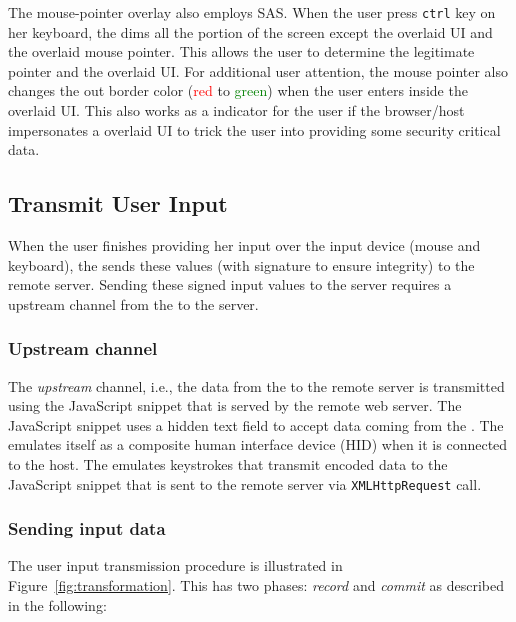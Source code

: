  The mouse-pointer overlay also employs SAS. When the user press \texttt{ctrl} key on her keyboard, the \device dims all the portion of the screen except the overlaid UI and the overlaid mouse pointer. This allows the user to determine the legitimate pointer and the overlaid UI. For additional user attention, the mouse pointer also changes the out border color (\textcolor{red}{red} to \textcolor{green}{green}) when the user enters inside the overlaid UI. This also works as a indicator for the user if the browser/host impersonates a overlaid UI to trick the user into providing some security critical data.
 

\subsection{Transmit User Input}
\label{sec:systemDesign:commit}

When the user finishes providing her input over the input device (mouse and keyboard), the \device sends these values (with signature to ensure integrity) to the remote server. Sending these signed input values to the server requires a upstream channel from the \device to the server.

\subsubsection{Upstream channel}\label{sec:systemDesign:commit:upload} The \emph{upstream} channel, i.e., the data from the \device to the remote server is transmitted using the \name JavaScript snippet that is served by the remote web server. The \name JavaScript snippet uses a hidden text field to accept data coming from the \device. The \device emulates itself as a composite human interface device (HID) when it is connected to the host. The \device emulates keystrokes that transmit encoded data to the \name JavaScript snippet that is sent to the remote server via \texttt{XMLHttpRequest} call.

\subsubsection{Sending input data}\label{sec:systemDesign:commit:send}
The user input transmission procedure is illustrated in Figure~\ref{fig:transformation}. This has two phases: \emph{record} and \emph{commit} as described in the following:

